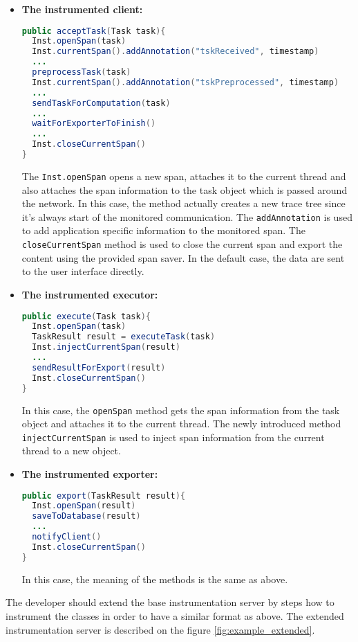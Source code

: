 \begin{itemize}
\item \textbf{The instrumented client:}
\begin{lstlisting}[language=Java]
public acceptTask(Task task){
  Inst.openSpan(task)
  Inst.currentSpan().addAnnotation("tskReceived", timestamp)
  ...
  preprocessTask(task)
  Inst.currentSpan().addAnnotation("tskPreprocessed", timestamp)
  ...
  sendTaskForComputation(task)
  ...
  waitForExporterToFinish()
  ...
  Inst.closeCurrentSpan()
}
\end{lstlisting}
The \texttt{Inst.openSpan} opens a new span, attaches it to the current thread and also attaches the span information to the task object which is passed around the network. In this case, the method actually creates a new trace tree since it's always start of the monitored communication. The \texttt{addAnnotation} is used to add application specific information to the monitored span. The \texttt{closeCurrentSpan} method is used to close the current span and export the content using the provided span saver. In the default case, the data are sent to the user interface directly.


\item \textbf{The instrumented executor:}
\begin{lstlisting}[language=Java]
public execute(Task task){
  Inst.openSpan(task)
  TaskResult result = executeTask(task)
  Inst.injectCurrentSpan(result)
  ...
  sendResultForExport(result)
  Inst.closeCurrentSpan()
}
\end{lstlisting}
In this case, the \texttt{openSpan} method gets the span information from the task object and attaches it to the current thread. The newly introduced method \texttt{injectCurrentSpan} is used to inject span information from the current thread to a new object.

\item \textbf{The instrumented exporter:}
\begin{lstlisting}[language=Java]
public export(TaskResult result){
  Inst.openSpan(result)
  saveToDatabase(result)
  ...
  notifyClient()	
  Inst.closeCurrentSpan()
}
\end{lstlisting}
In this case, the meaning of the methods is the same as above.

\end{itemize}

The developer should extend the base instrumentation server by steps how to instrument the classes  in order to have a similar format as above. The extended instrumentation server is described on the figure \ref{fig:example_extended}.

